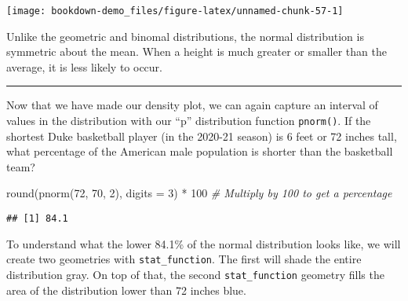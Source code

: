 \documentclass[
]{book}
\newenvironment{Shaded}{\begin{snugshade}}{\end{snugshade}}
\newcommand{\AttributeTok}[1]{\textcolor[rgb]{0.77,0.63,0.00}{#1}}
\newcommand{\CommentTok}[1]{\textcolor[rgb]{0.56,0.35,0.01}{\textit{#1}}}
\newcommand{\DecValTok}[1]{\textcolor[rgb]{0.00,0.00,0.81}{#1}}
\newcommand{\FunctionTok}[1]{\textcolor[rgb]{0.00,0.00,0.00}{#1}}
\newcommand{\NormalTok}[1]{#1}
\newcommand{\SpecialCharTok}[1]{\textcolor[rgb]{0.00,0.00,0.00}{#1}}
\begin{document}
\begin{center}\texttt{[image: bookdown-demo\_files/figure-latex/unnamed-chunk-57-1]} \end{center}

Unlike the geometric and binomal distributions, the normal distribution is symmetric about the mean. When a height is much greater or smaller than the average, it is less likely to occur.

\begin{center}\rule{0.5\linewidth}{0.5pt}\end{center}

Now that we have made our density plot, we can again capture an interval of values in the distribution with our ``p'' distribution function \texttt{pnorm()}. If the shortest Duke basketball player (in the 2020-21 season) is 6 feet or 72 inches tall, what percentage of the American male population is shorter than the basketball team?

\begin{Shaded}
\begin{Highlighting}[]
\FunctionTok{round}\NormalTok{(}\FunctionTok{pnorm}\NormalTok{(}\DecValTok{72}\NormalTok{, }\DecValTok{70}\NormalTok{, }\DecValTok{2}\NormalTok{), }\AttributeTok{digits =} \DecValTok{3}\NormalTok{) }\SpecialCharTok{*} \DecValTok{100} \CommentTok{\# Multiply by 100 to get a percentage}
\end{Highlighting}
\end{Shaded}

\begin{verbatim}
## [1] 84.1
\end{verbatim}

To understand what the lower 84.1\% of the normal distribution looks like, we will create two geometries with \texttt{stat\_function}. The first will shade the entire distribution gray. On top of that, the second \texttt{stat\_function} geometry fills the area of the distribution lower than 72 inches blue.
\end{document}
